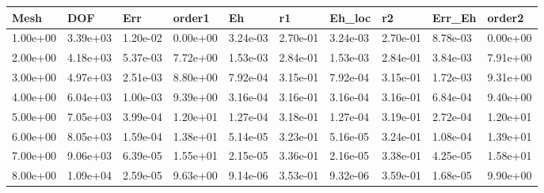 \begin{tabular}{llllllllll}
Mesh & DOF & Err & order1 & Eh & r1 & Eh_loc & r2 & Err_Eh & order2 \\ 
\hline 
1.00e+00 & 3.39e+03 & 1.20e-02 & 0.00e+00 & 3.24e-03 & 2.70e-01 & 3.24e-03 & 2.70e-01 & 8.78e-03 & 0.00e+00 \\ 
2.00e+00 & 4.18e+03 & 5.37e-03 & 7.72e+00 & 1.53e-03 & 2.84e-01 & 1.53e-03 & 2.84e-01 & 3.84e-03 & 7.91e+00 \\ 
3.00e+00 & 4.97e+03 & 2.51e-03 & 8.80e+00 & 7.92e-04 & 3.15e-01 & 7.92e-04 & 3.15e-01 & 1.72e-03 & 9.31e+00 \\ 
4.00e+00 & 6.04e+03 & 1.00e-03 & 9.39e+00 & 3.16e-04 & 3.16e-01 & 3.16e-04 & 3.16e-01 & 6.84e-04 & 9.40e+00 \\ 
5.00e+00 & 7.05e+03 & 3.99e-04 & 1.20e+01 & 1.27e-04 & 3.18e-01 & 1.27e-04 & 3.19e-01 & 2.72e-04 & 1.20e+01 \\ 
6.00e+00 & 8.05e+03 & 1.59e-04 & 1.38e+01 & 5.14e-05 & 3.23e-01 & 5.16e-05 & 3.24e-01 & 1.08e-04 & 1.39e+01 \\ 
7.00e+00 & 9.06e+03 & 6.39e-05 & 1.55e+01 & 2.15e-05 & 3.36e-01 & 2.16e-05 & 3.38e-01 & 4.25e-05 & 1.58e+01 \\ 
8.00e+00 & 1.09e+04 & 2.59e-05 & 9.63e+00 & 9.14e-06 & 3.53e-01 & 9.32e-06 & 3.59e-01 & 1.68e-05 & 9.90e+00 \\ 
\hline 
\end{tabular}